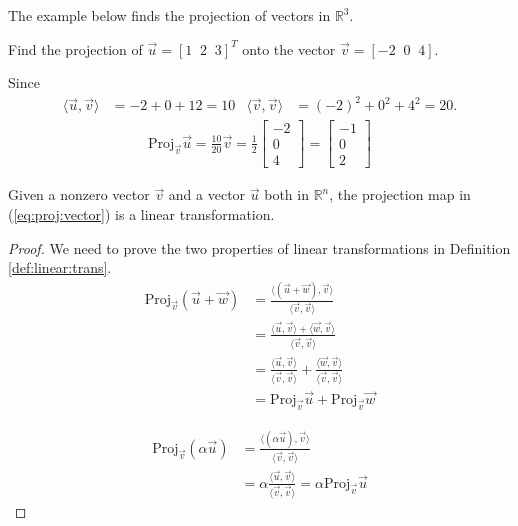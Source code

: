 The example below finds the projection of vectors in $\mathbb{R}^3$. 

\begin{example}
Find the projection of $\vec{u} = [1\;\;2\;\;3]^T$ onto the vector $\vec{v}=[-2\;\; 0\;\; 4]$. 

\solution
Since
\begin{align*}
\langle \vec{u}, \vec{v} \rangle & = -2+0+12=10 & \langle \vec{v},\vec{v} \rangle & = (-2)^2 + 0^2 + 4^2 =20.  
\end{align*}
\begin{align*}
\text{Proj}_{\vec{v}} \vec{u} =  \frac{10}{20} \vec{v} = \frac{1}{2} \begin{bmatrix}
-2 \\ 0 \\ 4 
\end{bmatrix} = \begin{bmatrix}
-1 \\ 0 \\ 2 
\end{bmatrix}
\end{align*}

\end{example}



\begin{theorem} \label{thm:proj:map}
Given a nonzero vector $\vec{v}$ and a vector $\vec{u}$ both in $\mathbb{R}^n$, the projection map in (\ref{eq:proj:vector}) is a linear transformation. 
\end{theorem}

\begin{proof} We need to prove the two properties of linear transformations in Definition \ref{def:linear:trans}. 
\begin{align*}
\text{Proj}_{\vec{v}}(\vec{u} + \vec{w}) & = \frac{\langle (\vec{u}+\vec{w}), \vec{v} \rangle}{\langle \vec{v},\vec{v} \rangle} \\
& = \frac{\langle \vec{u},\vec{v} \rangle + \langle \vec{w},\vec{v} \rangle}{\langle \vec{v},\vec{v} \rangle }  \\
& = \frac{\langle \vec{u},\vec{v} \rangle}{\langle \vec{v},\vec{v} \rangle } + \frac{\langle \vec{w},\vec{v} \rangle}{\langle \vec{v},\vec{v} \rangle } \\
& = \text{Proj}_{\vec{v}} \vec{u} + \text{Proj}_{\vec{v}} \vec{w} 
\end{align*} 

\begin{align*}
\text{Proj}_{\vec{v}} (\alpha \vec{u}) & =  \frac{\langle (\alpha \vec{u}), \vec{v} \rangle}{\langle \vec{v},\vec{v} \rangle} \\
& = \alpha \frac{\langle  \vec{u}, \vec{v} \rangle}{\langle \vec{v},\vec{v} \rangle}  = \alpha \text{Proj}_{\vec{v}} \vec{u} 
\end{align*}
\end{proof}

